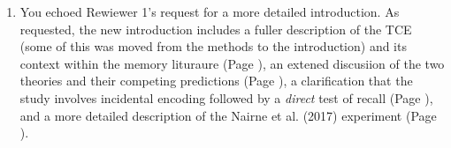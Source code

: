 \documentclass[12pt]{article}
\begin{document}
\begin{enumerate}

\item
	You echoed Rewiewer 1's request for a more detailed introduction. As requested, the new introduction includes a fuller description of the TCE (some of this was moved from the methods to the introduction) and its context within the memory lituraure (Page \pageref{TODO-1}), %
	an extened discusiion of the two theories and their competing predictions (Page \pageref{TODO-2}),
	a clarification that the study involves incidental encoding followed by a \emph{direct} test of recall (Page  \pageref{TODO-3}),
	and a more detailed description of the Nairne et al. (2017) experiment (Page \pageref{TODO-4}).


\end{enumerate}
\end{document}
